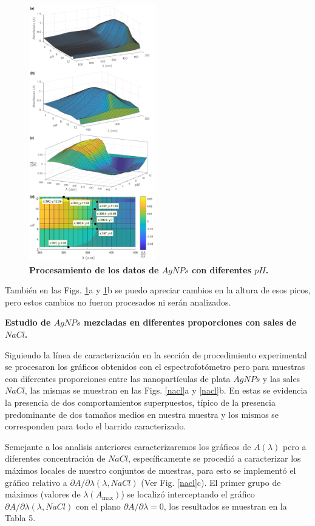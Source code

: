 \begin{figure}
    \includegraphics[width=0.49\textwidth]{Tarea3/AgNPs_pH.png}
    \caption{\textbf{Procesamiento de los datos de $AgNPs$ con diferentes $pH$.}}
    \label{diff_pH}
\end{figure}
También en las Figs. \ref{diff_pH}a y \ref{diff_pH}b se puedo apreciar cambios en la altura de esos picos, pero estos cambios no fueron procesados ni serán analizados.

\textbf{Estudio de $AgNPs$ mezcladas en diferentes proporciones con sales de $NaCl$.}

Siguiendo la línea de caracterización en la sección de procedimiento experimental se procesaron los gráficos obtenidos con el espectrofotómetro pero para muestras con diferentes proporciones entre las nanopartículas de plata $AgNPs$ y las sales $NaCl$, las mismas se muestran en las Figs. \ref{nacl}a y \ref{nacl}b. En estas se evidencia la presencia de dos comportamientos superpuestos, típico de la presencia  predominante de dos tamaños medios en nuestra muestra y los mismos se corresponden para todo el barrido caracterizado.

Semejante a los analisis anteriores caracterizaremos los gráficos de $A(\lambda)$ pero a diferentes concentración de $NaCl$, específicamente se procedió a caracterizar los máximos locales de nuestro conjuntos de muestras, para esto se implementó el gráfico relativo a $\partial A/\partial \lambda(\lambda,NaCl)$ (Ver Fig. \ref{nacl}c). El primer grupo de máximos (valores de $\lambda(A_{\max})$) se localizó interceptando el gráfico $\partial A/\partial \lambda(\lambda,NaCl)$ con el plano $\partial A/\partial \lambda =0$, los resultados se muestran en la Tabla 5.


